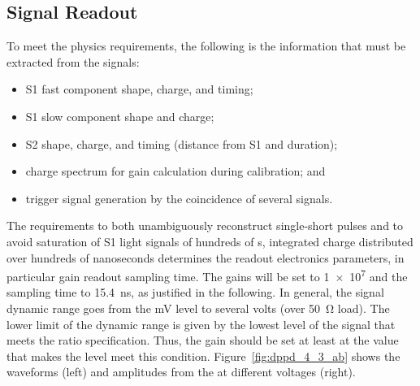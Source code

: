 \subsection{Signal Readout}
\label{sec:fddp-pd-4.3}

To meet the physics requirements, the following is the information that must be extracted from the  signals:

\begin{itemize}
\item S1 fast component shape, charge, and timing;
\item S1 slow component shape and charge;
\item S2 shape, charge, and timing (distance from S1 and duration);
\item {} charge spectrum for gain calculation during  calibration; and
\item trigger signal generation by the coincidence of several  signals.
\end{itemize}


The requirements to both unambiguously reconstruct single-\phel short pulses and to avoid saturation of S1 light signals of hundreds of \phel{}s, integrated charge distributed over hundreds of nanoseconds determines the readout electronics parameters, in particular  gain readout sampling time. The  gains will be set to \num{1e7} and the sampling time to \SI{15.4}{ns}, as justified in the following. In general, the  signal dynamic range goes from the \si{mV} level to several volts (over \SI{50}{\ohm} load). The lower limit of the  dynamic range is given by the lowest level of the  signal that meets the  ratio specification. Thus, the  gain should be set at least at the value that makes the  level meet this condition. Figure~\ref{fig:dppd_4_3_ab} shows the  waveforms (left) and amplitudes from the  at different voltages (right).

